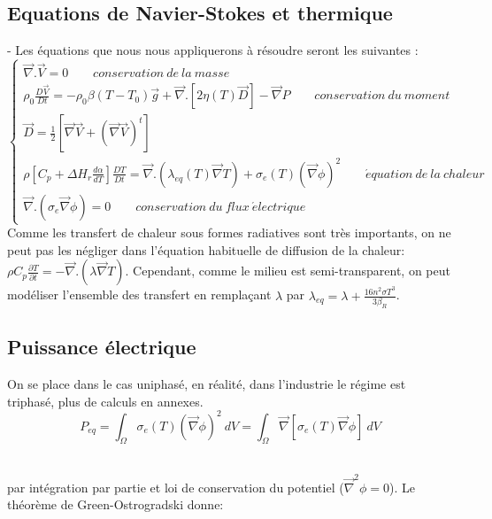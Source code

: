 \documentclass[12pt, a4paper, french, BCOR = 0pt, DIV = 10]{scrartcl}
\begin{document}
    \subsection{ Equations de Navier-Stokes et thermique}
    - Les équations que nous nous appliquerons à résoudre seront les suivantes : \\
    \centering
    $$
    \left\{
    \begin{array} {ll} 
        \vec {\nabla}. \vec{V} = 0  ~~~~~~~~~  conservation~de~la~masse\\
        
        \rho_{0} \frac{D\vec{V}}{Dt} = -\rho_{0} \beta (T-T_{0}) \vec{g} + \vec {\nabla} . [ 2 \eta (T) \vec{D}] - \vec {\nabla} P  ~~~~~~~~~ conservation~du~moment \\   
        
        \vec{D} = \frac{1}{2} [\vec{\nabla} \vec{V} + (\vec{\nabla} \vec{V})^t ] \\
        \rho [ C_{p}+ \Delta H_{r} \frac{d\alpha}{dT}] \frac{DT}{Dt} = \vec {\nabla} .  (\lambda_{eq}(T) \vec{\nabla} T ) + \sigma_{e}(T) (\vec \nabla\phi)^2  ~~~~~~~~~ \acute equation~de ~la~chaleur \\
        
        \vec{\nabla} . (\sigma_{e} \vec{\nabla} \phi) = 0  ~~~~~~~~~ conservation~du~flux~ \acute electrique
        
        
    \end{array}
    \right. 
    $$
    Comme les transfert de chaleur sous formes radiatives sont très importants, on ne peut pas les négliger dans l'équation habituelle de diffusion de la chaleur: $ \rho C_{p} \frac{\partial T}{\partial t} = - \vec{\nabla} . (\lambda\vec{\nabla}T) $. Cependant, comme le milieu est semi-transparent, on peut modéliser l'ensemble des transfert en remplaçant $\lambda$ par $\lambda_{eq} = \lambda + \frac{16n^{2} \sigma T^{3}}{3\beta_{R}} $.
    \\ [0.5 cm]
    
    
    \subsection{Puissance électrique}
    \raggedright
    On se place dans le cas uniphasé, en réalité, dans l'industrie le régime est triphasé, plus de calculs en annexes. \\ [0.2 cm ]
    \centering
    \[ P_{eq}=\int_\Omega \sigma_{e}(T)(\vec \nabla\phi)^2~dV  = \int_\Omega \vec \nabla[\sigma_{e}(T)\vec \nabla\phi]~dV \]\\
    \raggedright
    par intégration par partie et loi de conservation du potentiel ($ \vec{\nabla}^2 \phi = 0 $). Le théorème de Green-Ostrogradski donne: 
    
\end{document}
